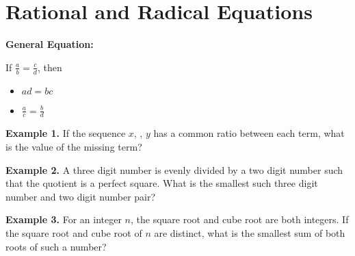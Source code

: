 \section{Rational and Radical Equations}

\bigskip
\textbf{General Equation:}

\bigskip
If $\frac{a}{b}=\frac{c}{d}$, then

\bigskip
\begin{itemize}[label=$\bullet$]
\item $ad=bc$

\bigskip
\item $\frac{a}{c}=\frac{b}{d}$
\end{itemize}

\vfill
\textbf{Example 1.} If the sequence $x$, \shortline, $y$ has a common ratio between each term, what is the value of the missing term?

\vfill
\textbf{Example 2.} A three digit number is evenly divided by a two digit number such that the quotient is a perfect square. What is the smallest such three digit number and two digit number pair?

\vfill
\textbf{Example 3.} For an integer $n$, the square root and cube root are both integers. If the square root and cube root of $n$ are distinct, what is the smallest sum of both roots of such a number?

